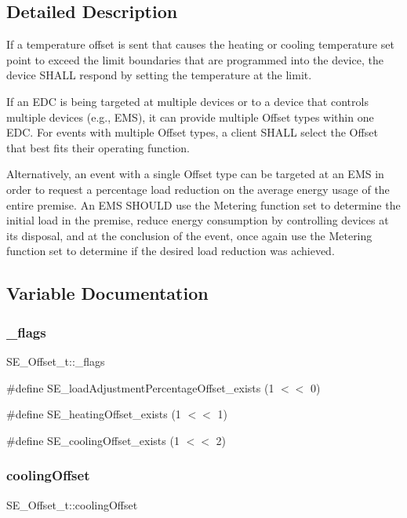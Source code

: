 \subsection{Detailed Description}
If a temperature offset is sent that causes the heating or cooling temperature set point to exceed the limit boundaries that are programmed into the device, the device S\+H\+A\+LL respond by setting the temperature at the limit.

If an E\+DC is being targeted at multiple devices or to a device that controls multiple devices (e.\+g., E\+MS), it can provide multiple Offset types within one E\+DC. For events with multiple Offset types, a client S\+H\+A\+LL select the Offset that best fits their operating function.

Alternatively, an event with a single Offset type can be targeted at an E\+MS in order to request a percentage load reduction on the average energy usage of the entire premise. An E\+MS S\+H\+O\+U\+LD use the Metering function set to determine the initial load in the premise, reduce energy consumption by controlling devices at its disposal, and at the conclusion of the event, once again use the Metering function set to determine if the desired load reduction was achieved. 

\subsection{Variable Documentation}
\mbox{\label{group__Offset_gace5a81a43bae113bcd0c8770fbd38ed2}} 
\subsubsection{\texorpdfstring{\+\_\+flags}{\_flags}}
{\footnotesize\ttfamily S\+E\+\_\+\+Offset\+\_\+t\+::\+\_\+flags}

\#define S\+E\+\_\+load\+Adjustment\+Percentage\+Offset\+\_\+exists (1 $<$$<$ 0)

\#define S\+E\+\_\+heating\+Offset\+\_\+exists (1 $<$$<$ 1)

\#define S\+E\+\_\+cooling\+Offset\+\_\+exists (1 $<$$<$ 2) \mbox{\label{group__Offset_ga86382d921f0bb39066867b7519d207fa}} 
\subsubsection{\texorpdfstring{cooling\+Offset}{coolingOffset}}
{\footnotesize\ttfamily S\+E\+\_\+\+Offset\+\_\+t\+::cooling\+Offset}

